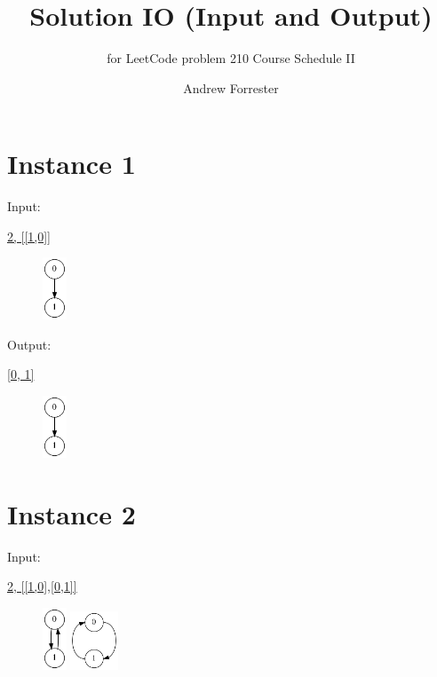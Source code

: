 \documentclass[10pt]{article}
\title{Solution IO (Input and Output)}
\subtitle{for LeetCode problem 210 Course Schedule II}
\author{Andrew Forrester}
\date{}
\begin{document}
\maketitle


\section*{Instance 1}

\squishlist
  \item \parbox{40pt}{Input:}  \url{2, [[1,0]]}
\squishend
\begin{figure}[h!]
  \hspace{50pt}
  \includegraphics[width=20pt]{Input/Graph_1.gv.png}
\end{figure}

\squishlist
  \item \parbox{40pt}{Output:} \url{[0, 1]}
\squishend
\begin{figure}[h!]
  \hspace{50pt}
  \includegraphics[width=20pt]{Input/Graph_1.gv.png}
\end{figure}


\section*{Instance 2}

\squishlist
  \item \parbox{40pt}{Input:}  \url{2, [[1,0],[0,1]]}
\squishend
\begin{figure}[h!]
  \hspace{50pt}
  \includegraphics[width=20pt]{Input/Graph_2a.gv.png}
  \hspace{50pt}
  \hspace{50pt}
  \includegraphics[width=40pt]{Input/Graph_2b.gv.png}
\end{figure}
\end{document}
